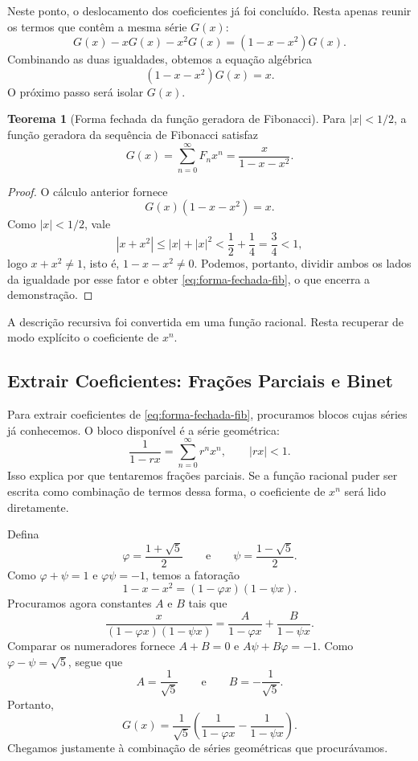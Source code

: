 \documentclass[12pt,portuguese]{article}
\theoremstyle{definition}
\newtheorem{theorem}{Teorema}
\theoremstyle{plainexercise}
\theoremstyle{starredexercise}
\theoremstyle{definition}
\begin{document}
Neste ponto, o deslocamento dos coeficientes já foi concluído. Resta apenas
reunir os termos que contêm a mesma série $G(x)$:
\[
G(x)-xG(x)-x^2G(x)=(1-x-x^2)G(x).
\]
Combinando as duas igualdades, obtemos a equação algébrica
\[
(1-x-x^2)G(x)=x.
\]
O próximo passo será isolar $G(x)$.

\begin{theorem}[Forma fechada da função geradora de Fibonacci]\label{thm:forma-fechada-fib}
Para $|x|<1/2$, a função geradora da sequência de Fibonacci satisfaz
\begin{equation}\label{eq:forma-fechada-fib}
G(x)=\sum_{n=0}^{\infty}F_nx^n
=\frac{x}{1-x-x^2}.
\end{equation}
\end{theorem}

\begin{proof}
O cálculo anterior fornece
\[
G(x)(1-x-x^2)=x.
\]
Como $|x|<1/2$, vale
\[
|x+x^2|\leqslant |x|+|x|^2<\frac12+\frac14=\frac34<1,
\]
logo $x+x^2\neq 1$, isto é, $1-x-x^2\neq0$. Podemos, portanto, dividir ambos
os lados da igualdade por esse fator e obter \eqref{eq:forma-fechada-fib}, o que
encerra a demonstração.
\end{proof}

A descrição recursiva foi convertida em uma função racional. Resta recuperar
de modo explícito o coeficiente de $x^n$.

\subsection{Extrair Coeficientes: Frações Parciais e Binet}
\label{sec:extracao-coeficientes-fibonacci}

Para extrair coeficientes de \eqref{eq:forma-fechada-fib}, procuramos blocos
cujas séries já conhecemos. O bloco disponível é a série geométrica:
\[
\frac{1}{1-rx}=\sum_{n=0}^{\infty}r^nx^n,
\qquad |rx|<1.
\]
Isso explica por que tentaremos frações parciais. Se a função racional puder
ser escrita como combinação de termos dessa forma, o coeficiente de $x^n$ será
lido diretamente.

Defina
\[
\varphi=\frac{1+\sqrt{5}}{2}
\qquad\text{e}\qquad
\psi=\frac{1-\sqrt{5}}{2}.
\]
Como $\varphi+\psi=1$ e $\varphi\psi=-1$, temos a fatoração
\[
1-x-x^2=(1-\varphi x)(1-\psi x).
\]
Procuramos agora constantes $A$ e $B$ tais que
\[
\frac{x}{(1-\varphi x)(1-\psi x)}
=\frac{A}{1-\varphi x}+\frac{B}{1-\psi x}.
\]
Comparar os numeradores fornece $A+B=0$ e
$A\psi+B\varphi=-1$. Como $\varphi-\psi=\sqrt{5}$, segue que
\[
A=\frac{1}{\sqrt{5}}
\qquad\text{e}\qquad B=-\frac{1}{\sqrt{5}}.
\]
Portanto,
\[
G(x)=\frac{1}{\sqrt{5}}
\left(
\frac{1}{1-\varphi x}-\frac{1}{1-\psi x}
\right).
\]
Chegamos justamente à combinação de séries geométricas que procurávamos.
\end{document}

